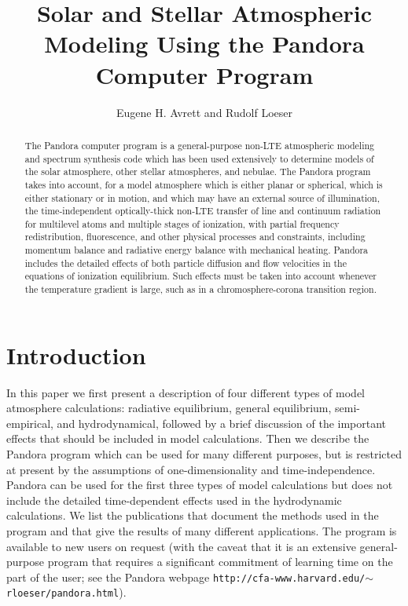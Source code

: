 \documentclass[11pt,twoside]{article}
\begin{document}
\title{Solar and Stellar Atmospheric Modeling Using the
Pandora Computer Program}

\author{Eugene H. Avrett and Rudolf Loeser}


\begin{abstract}
The Pandora computer program is a general-purpose non-LTE atmospheric
modeling and spectrum synthesis code which has been used extensively to
determine models of the solar atmosphere, other stellar atmospheres, and
nebulae. The Pandora program takes into account,
for a model atmosphere which is either planar or spherical,
which is either stationary or in motion, and which may
have an external source of illumination, the time-independent optically-thick 
non-LTE transfer of line and continuum radiation for multilevel atoms and multiple 
stages of ionization, with partial frequency redistribution, fluorescence, and 
other physical processes and constraints, including momentum balance and radiative 
energy balance with mechanical heating. Pandora includes the detailed
effects of both particle diffusion and flow velocities in the equations of 
ionization equilibrium. Such effects must be taken into account whenever the 
temperature gradient is large, such as in a chromosphere-corona transition 
region.
\end{abstract}

\section{Introduction}

In this paper we first present a description of four different types of model 
atmosphere calculations: radiative equilibrium, general equilibrium, 
semi-empirical, and hydrodynamical, followed by a brief discussion of the 
important effects that should be included in model calculations.  Then
we describe the Pandora program which can be used for many
different purposes, but is restricted at present by the assumptions of
one-dimensionality and time-independence.  Pandora can be used
for the first three types of model calculations but does not include the
detailed time-dependent effects used in the hydrodynamic calculations.  
We list the publications that document the methods used in the program and 
that give the results of many different applications.  The program is 
available to new users on request (with the caveat that it is an extensive
general-purpose program that requires a significant commitment of learning
time on the part of the user; see the Pandora webpage
{\tt http://cfa-www.harvard.edu/$\sim$rloeser/pandora.html}).
\end{document}
